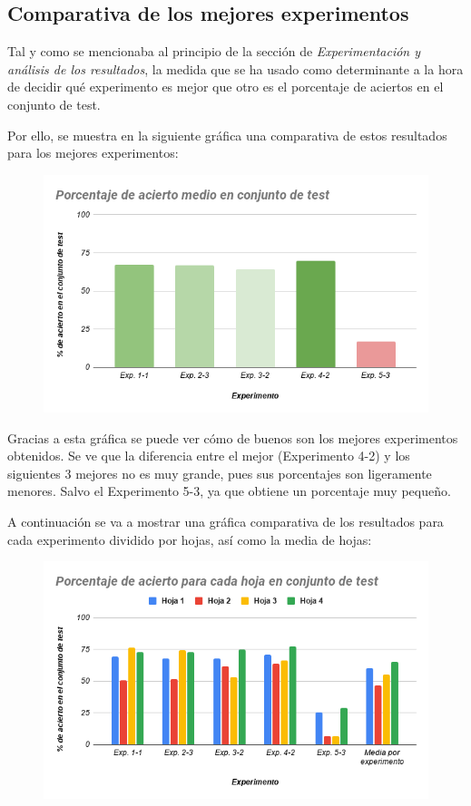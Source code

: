\documentclass{uc3mpracticas}
\begin{document}
\subsection{Comparativa de los mejores experimentos}

Tal y como se mencionaba al principio de la sección de  \textit{Experimentación y análisis de los resultados}, la medida que se ha usado como determinante a la hora de decidir qué experimento es mejor que otro es el porcentaje de aciertos en el conjunto de test.

\vspace{2mm}

Por ello, se muestra en la siguiente gráfica una comparativa de estos resultados para los mejores experimentos:

\begin{figure}[!h]
\centering
  \includegraphics[width=.7\linewidth]{Images/p_acierto_medio_test.png}
\end{figure}

Gracias a esta gráfica se puede ver cómo de buenos son los mejores experimentos obtenidos. Se ve que la diferencia entre el mejor (Experimento 4-2) y los siguientes 3 mejores no es muy grande, pues sus porcentajes son ligeramente menores. Salvo el Experimento 5-3, ya que obtiene un porcentaje muy pequeño.

\vspace{2mm}

A continuación se va a mostrar una gráfica comparativa de los resultados para cada experimento dividido por hojas, así como la media de hojas:

\begin{figure}[!h]
\centering
  \includegraphics[width=.7\linewidth]{Images/p_acierto_cada_hoja_test.png}
\end{figure}
\end{document}
